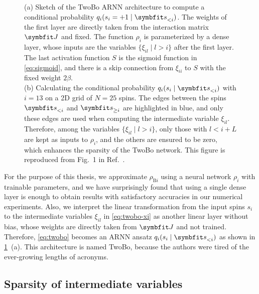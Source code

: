 \begin{figure}[htb]
\centering
\hspace*{\fill}
\hspace*{\fill}
\hspace*{\fill}
\caption[Architecture of the sparse two-body ARNN (TwoBo)]{
(a) Sketch of the TwoBo ARNN architecture to compute a conditional probability $q_i(s_i = +1 \mid \vs_{< i})$.
The weights of the first layer are directly taken from the interaction matrix $\mJ$ and fixed.
The function $\rho_i$ is parameterized by a dense layer, whose inputs are the variables $\{\xi_{i l} \mid l > i\}$ after the first layer.
The last activation function $S$ is the sigmoid function in \cref{eq:sigmoid}, and there is a skip connection from $\xi_{i i }$ to $S$ with the fixed weight $2 \beta$. \\
(b) Calculating the conditional probability $q_i(s_i \mid \vs_{< i})$ with $i = 13$ on a 2D grid of $N = 25$ spins. The edges between the spins $\vs_{< i}$ and $\vs_{\ge i}$ are highlighted in blue, and only these edges are used when computing the intermediate variable $\xi_{i l}$. Therefore, among the variables $\{\xi_{i l} \mid l > i\}$, only those with $l < i + L$ are kept as inputs to $\rho_i$, and the others are ensured to be zero, which enhances the sparsity of the TwoBo network.
This figure is reproduced from Fig.~1 in Ref.~\cite{biazzo2024sparse}.
}
\label{fig:twobo-arch-grid}
\end{figure}

For the purpose of this thesis, we approximate $\rho_{\text{B} i}$ using a neural network $\rho_i$ with trainable parameters, and we have surprisingly found that using a single dense layer is enough to obtain results with satisfactory accuracies in our numerical experiments. Also, we interpret the linear transformation from the input spins $s_i$ to the intermediate variables $\xi_{i l}$ in \cref{eq:twobo-xi} as another linear layer without bias, whose weights are directly taken from $\mJ$ and not trained. Therefore, \cref{eq:twobo} becomes an ARNN ansatz $q_i(s_i \mid \vs_{< i})$ as shown in \cref{fig:twobo-arch-grid}~(a). This architecture is named TwoBo, because the authors were tired of the ever-growing lengths of acronyms.

\subsection{Sparsity of intermediate variables}
\label{sec:twobo-sparse}

